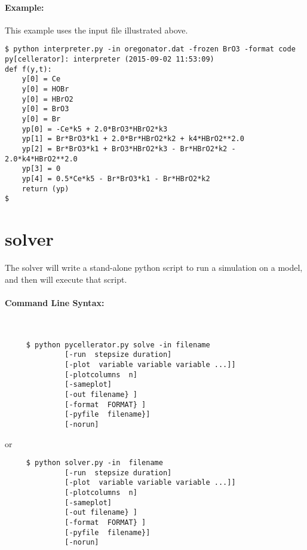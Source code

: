 \paragraph{Example:}

This example uses the input file illustrated above.


\begin{lstlisting}
$ python interpreter.py -in oregonator.dat -frozen BrO3 -format code
py[cellerator]: interpreter (2015-09-02 11:53:09)
def f(y,t):
    y[0] = Ce
    y[0] = HOBr
    y[0] = HBrO2
    y[0] = BrO3
    y[0] = Br
    yp[0] = -Ce*k5 + 2.0*BrO3*HBrO2*k3
    yp[1] = Br*BrO3*k1 + 2.0*Br*HBrO2*k2 + k4*HBrO2**2.0
    yp[2] = Br*BrO3*k1 + BrO3*HBrO2*k3 - Br*HBrO2*k2 - 2.0*k4*HBrO2**2.0
    yp[3] = 0
    yp[4] = 0.5*Ce*k5 - Br*BrO3*k1 - Br*HBrO2*k2
    return (yp)
$
\end{lstlisting}


\section{solver}

The solver will write a stand-alone python script to run a simulation on a model, and then will execute that script. 
\paragraph{Command Line Syntax:}\ 

 


\begin{lstlisting}
     $ python pycellerator.py solve -in filename
              [-run  stepsize duration]
              [-plot  variable variable variable ...]]
              [-plotcolumns  n]
              [-sameplot]
              [-out filename} ]
              [-format  FORMAT} ]
              [-pyfile  filename}]
              [-norun]
              \end{lstlisting}

or
\clearpage
\begin{lstlisting}
     $ python solver.py -in  filename
              [-run  stepsize duration]
              [-plot  variable variable variable ...]]
              [-plotcolumns  n]
              [-sameplot]
              [-out filename} ]
              [-format  FORMAT} ]
              [-pyfile  filename}]
              [-norun]
              \end{lstlisting}


